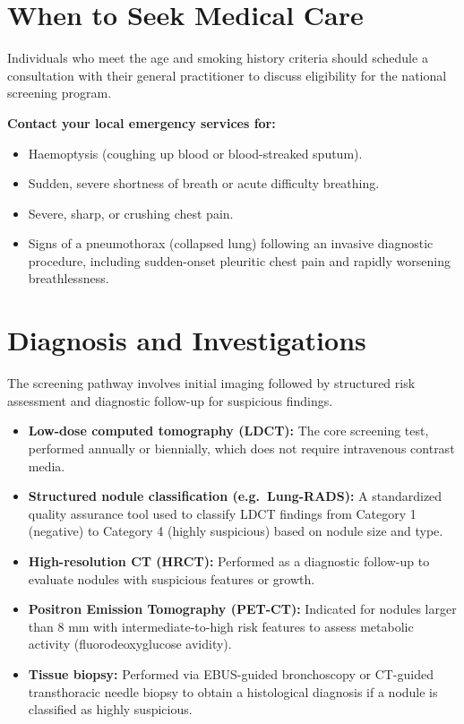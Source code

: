 \section*{When to Seek Medical Care}
Individuals who meet the age and smoking history criteria should schedule a consultation with their general practitioner to discuss eligibility for the national screening program.

\textbf{Contact your local emergency services for:}
\begin{itemize}
    \item Haemoptysis (coughing up blood or blood-streaked sputum).
    \item Sudden, severe shortness of breath or acute difficulty breathing.
    \item Severe, sharp, or crushing chest pain.
    \item Signs of a pneumothorax (collapsed lung) following an invasive diagnostic procedure, including sudden-onset pleuritic chest pain and rapidly worsening breathlessness.
\end{itemize}

\section*{Diagnosis and Investigations}
The screening pathway involves initial imaging followed by structured risk assessment and diagnostic follow-up for suspicious findings.
\begin{itemize}
    \item \textbf{Low-dose computed tomography (LDCT):} The core screening test, performed annually or biennially, which does not require intravenous contrast media.
    \item \textbf{Structured nodule classification (e.g.\ Lung-RADS):} A standardized quality assurance tool used to classify LDCT findings from Category 1 (negative) to Category 4 (highly suspicious) based on nodule size and type.
    \item \textbf{High-resolution CT (HRCT):} Performed as a diagnostic follow-up to evaluate nodules with suspicious features or growth.
    \item \textbf{Positron Emission Tomography (PET-CT):} Indicated for nodules larger than 8 mm with intermediate-to-high risk features to assess metabolic activity (fluorodeoxyglucose avidity).
    \item \textbf{Tissue biopsy:} Performed via EBUS-guided bronchoscopy or CT-guided transthoracic needle biopsy to obtain a histological diagnosis if a nodule is classified as highly suspicious.
\end{itemize}

